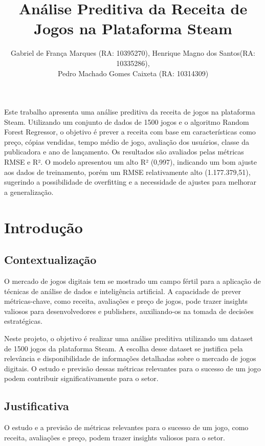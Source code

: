 \documentclass[12pt]{article}
\title{Análise Preditiva da Receita de Jogos na Plataforma Steam}
\author{Gabriel de França Marques (RA: 10395270)\inst{1}, Henrique Magno dos Santos(RA: 10335286)\inst{1}, \\ 
Pedro Machado Gomes Caixeta (RA: 10314309)\inst{1}}
\begin{document}
 

\maketitle

\begin{resumo}
Este trabalho apresenta uma análise preditiva da receita de jogos na plataforma Steam. Utilizando um conjunto de dados de 1500 jogos e o algoritmo Random Forest Regressor, o objetivo é prever a receita com base em características como preço, cópias vendidas, tempo médio de jogo, avaliação dos usuários, classe da publicadora e ano de lançamento. Os resultados são avaliados pelas métricas RMSE e R². O modelo apresentou um alto R² (0,997), indicando um bom ajuste aos dados de treinamento, porém um RMSE relativamente alto (1.177.379,51), sugerindo a possibilidade de overfitting e a necessidade de ajustes para melhorar a generalização.
\end{resumo}


\section{Introdução}
\subsection{Contextualização} \label{sec:contextualizacao}

O mercado de jogos digitais tem se mostrado um campo fértil para a aplicação de técnicas 
de análise de dados e inteligência artificial. A capacidade de prever métricas-chave, 
como receita, avaliações e preço de jogos, pode trazer insights valiosos para 
desenvolvedores e publishers, auxiliando-os na tomada de decisões estratégicas.

Neste projeto, o objetivo é realizar uma análise preditiva utilizando um dataset de 1500 
jogos da plataforma Steam. A escolha desse dataset se justifica pela relevância e 
disponibilidade de informações detalhadas sobre o mercado de jogos digitais. O estudo e 
 previsão dessas métricas relevantes para o sucesso de um jogo podem contribuir 
 significativamente para o setor.

\subsection{Justificativa} \label{sec:firstpage}

O estudo e a previsão de métricas relevantes para o sucesso de um jogo, como receita, 
avaliações e preço, podem trazer insights valiosos para o setor.
\end{document}
